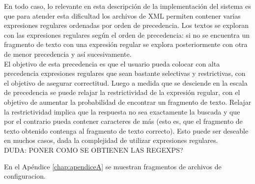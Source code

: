 En todo caso, lo relevante en esta descripción de la implementación del sistema es que para atender esta dificultad los archivos de XML permiten contener varias expresiones regulares ordenadas por orden de precedencia. Los textos se exploran con las expresiones regulares según el orden de precedencia: si no se encuentra un fragmento de texto con una expresión regular se explora posteriormente con otra de menor precedencia y así sucesivamente. \\

El objetivo de esta precedencia es que el usuario pueda colocar con alta precedencia expresiones regulares que sean bastante selectivas y restrictivas, con el objetivo de asegurar correctitud. Luego a medida que se desciende en la escala de precedencia se puede relajar la restrictividad de la expresión regular, con el objetivo de aumentar la probabilidad de encontrar un fragmento de texto. Relajar la restrictividad implica que la respuesta no sea exactamente la buscada y que por el contrario pueda contener caracteres de más (esto es, que el fragmento de texto obtenido contenga al fragmento de texto correcto). Esto puede ser deseable en muchos casos, dada la complejidad de utilizar expresiones regulares.  \\

DUDA: PONER COMO SE OBTIENEN LAS REGEXPS?

En el Apéndice \ref{chap:apendiceA} se muestran fragmentos de archivos de configuracion. \\
